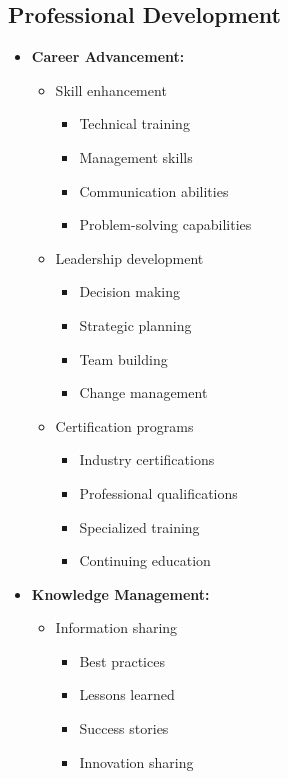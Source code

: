 \subsection{Professional Development}
\begin{itemize}
    \item \textbf{Career Advancement:}
    \begin{itemize}
        \item Skill enhancement
        \begin{itemize}
            \item Technical training
            \item Management skills
            \item Communication abilities
            \item Problem-solving capabilities
        \end{itemize}
        
        \item Leadership development
        \begin{itemize}
            \item Decision making
            \item Strategic planning
            \item Team building
            \item Change management
        \end{itemize}
        
        \item Certification programs
        \begin{itemize}
            \item Industry certifications
            \item Professional qualifications
            \item Specialized training
            \item Continuing education
        \end{itemize}
    \end{itemize}
    
    \item \textbf{Knowledge Management:}
    \begin{itemize}
        \item Information sharing
        \begin{itemize}
            \item Best practices
            \item Lessons learned
            \item Success stories
            \item Innovation sharing
        \end{itemize}
        

\end{itemize}
\end{itemize}
